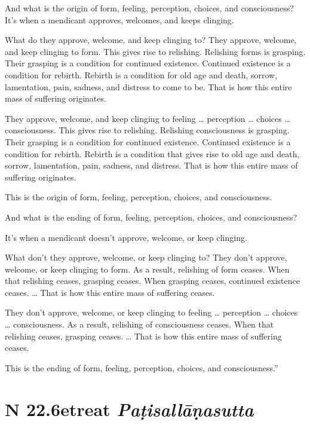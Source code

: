 \documentclass[12pt,openany]{book}%
\newcommand*{\suttatitleacronym}[1]{\smaller[2]{#1}\vspace*{.3em}}
\newcommand*{\suttatitletranslation}[1]{\linebreak{#1}}
\newcommand*{\suttatitleroot}[1]{\linebreak\smaller[2]\itshape{#1}}
\newcommand*{\tocacronym}[1]{\hspace*{-3.3em}{#1}\quad}
\newcommand*{\toctranslation}[1]{#1}
\newcommand*{\tocroot}[1]{(\textit{#1})}
\begin{document}
And what is the origin of form, feeling, perception, choices, and consciousness? It’s when a mendicant approves, welcomes, and keeps clinging. 

What do they approve, welcome, and keep clinging to? They approve, welcome, and keep clinging to form. This gives rise to relishing. Relishing forms is grasping. Their grasping is a condition for continued existence. Continued existence is a condition for rebirth. Rebirth is a condition for old age and death, sorrow, lamentation, pain, sadness, and distress to come to be. That is how this entire mass of suffering originates. 

They approve, welcome, and keep clinging to feeling … perception … choices … consciousness. This gives rise to relishing. Relishing consciousness is grasping. Their grasping is a condition for continued existence. Continued existence is a condition for rebirth. Rebirth is a condition that gives rise to old age and death, sorrow, lamentation, pain, sadness, and distress. That is how this entire mass of suffering originates. 

This is the origin of form, feeling, perception, choices, and consciousness. 

And what is the ending of form, feeling, perception, choices, and consciousness? 

It’s when a mendicant doesn’t approve, welcome, or keep clinging. 

What don’t they approve, welcome, or keep clinging to? They don’t approve, welcome, or keep clinging to form. As a result, relishing of form ceases. When that relishing ceases, grasping ceases. When grasping ceases, continued existence ceases. … That is how this entire mass of suffering ceases. 

They don’t approve, welcome, or keep clinging to feeling … perception … choices … consciousness. As a result, relishing of consciousness ceases. When that relishing ceases, grasping ceases. … That is how this entire mass of suffering ceases. 

This is the ending of form, feeling, perception, choices, and consciousness.” 

%
\section*{{\suttatitleacronym SN 22.6}{\suttatitletranslation Retreat }{\suttatitleroot Paṭisallāṇasutta}}
\addcontentsline{toc}{section}{\tocacronym{SN 22.6} \toctranslation{Retreat } \tocroot{Paṭisallāṇasutta}}
\end{document}
